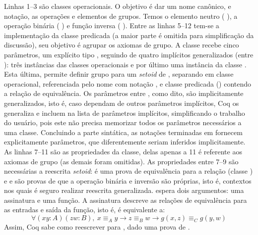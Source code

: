 Linhas 1--3 são classes operacionais. O objetivo é dar um nome canônico, e notação, as operações e elementos de grupos. Temos o elemento neutro (  ), a operação binária (  \coqinline{+}) e função inversa (  \coqinline{-}). Entre as linhas 5--12 tem-se a implementação da classe predicada  (a maior parte é omitida para simplificação da discussão), seu objetivo é agrupar os axiomas de grupo. A classe recebe cinco parâmetros, um explícito tipo , seguindo de quatro implícitos generalizados (entre ): três instâncias das classes operacionais e por último uma instância da classe . Esta última, permite definir grupo para um \textit{setoid} de , separando em classe operacional, referenciada pelo nome  com notação , e classe predicada () contendo a relação de equivalência. Os parâmetros entre , como dito, são implicitamente generalizados, isto é, caso dependam de outros parâmetros implícitos, Coq os generaliza e incluem na lista de parâmetros implícitos, simplificando o trabalho do usuário, pois este não precisa memorizar todos os parâmetros necessários a uma classe. Concluindo a parte sintática, as notações terminadas em  fornecem explicitamente parâmetros, que diferentemente seriam inferidos implicitamente. As linhas 7--11 são as propriedades da classe, delas apenas a 11 é referente aos axiomas de grupo (as demais foram omitidas). As propriedades entre 7--9 são necessárias a reescrita \textit{setoid}:  é uma prova de equivalência para a relação  (classe ) e  e  são provas de que a operação binária e inversão são próprias, isto é, contextos nos quais é seguro realizar reescrita generalizada.  espera dois argumentos: uma assinatura e uma função. A assinatura descreve as relações de equivalência para as entradas e saída da função, isto é,  é equivalente a:
\begin{equation*}\label{eq:proper}
	\forall (x y : A) (z w : B),~x \equiv_A y \rightarrow z \equiv_B w \rightarrow g(x,z) \equiv_C g(y,w)
\end{equation*}
Assim, Coq sabe como reescrever  para , dado uma prova de . 


